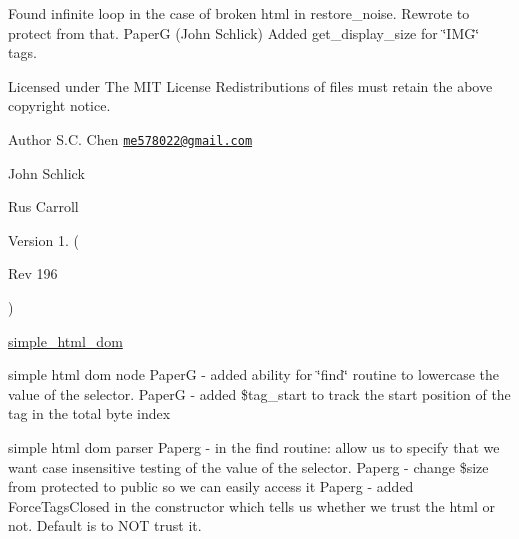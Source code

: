 Found infinite loop in the case of broken html in restore\+\_\+noise. Rewrote to protect from that. Paper\+G (John Schlick) Added get\+\_\+display\+\_\+size for \char`\"{}\+I\+M\+G\char`\"{} tags.

Licensed under The M\+I\+T License Redistributions of files must retain the above copyright notice.

\begin{DoxyAuthor}{Author}
S.\+C. Chen \href{mailto:me578022@gmail.com}{\tt me578022@gmail.\+com} 

John Schlick 

Rus Carroll 
\end{DoxyAuthor}
\begin{DoxyVersion}{Version}
1. (
\end{DoxyVersion}
\begin{DoxyParagraph}{Rev}
196 
\end{DoxyParagraph}
)

\hyperlink{classsimple__html__dom}{simple\+\_\+html\+\_\+dom}

simple html dom node Paper\+G -\/ added ability for \char`\"{}find\char`\"{} routine to lowercase the value of the selector. Paper\+G -\/ added \$tag\+\_\+start to track the start position of the tag in the total byte index

simple html dom parser Paperg -\/ in the find routine\+: allow us to specify that we want case insensitive testing of the value of the selector. Paperg -\/ change \$size from protected to public so we can easily access it Paperg -\/ added Force\+Tags\+Closed in the constructor which tells us whether we trust the html or not. Default is to N\+O\+T trust it. 